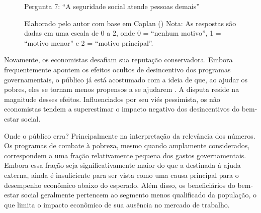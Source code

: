 \begin{figure}[H]
    \centering
    \caption*{Pergunta 7: “A seguridade social atende pessoas demais”}
    \caption{Elaborado pelo autor com base em Caplan (\citeyear{The_Myth_of_the_Rational_Voter}) \newline
    Nota: As respostas são dadas em uma escala de 0 a 2, onde 0 = “nenhum motivo”, 1 = “motivo menor” e 2 = “motivo principal”.}
    \label{fig:pergunta_7}
\end{figure}

Novamente, os economistas desafiam sua reputação conservadora. Embora frequentemente apontem os efeitos ocultos de desincentivo dos programas governamentais, o público já está acostumado com a ideia de que, ao ajudar os pobres, eles se tornam menos propensos a se ajudarem \cite{Murray1985-MURLGA-3}. A disputa reside na magnitude desses efeitos. Influenciados por seu viés pessimista, os não economistas tendem a superestimar o impacto negativo dos desincentivos do bem-estar social.

Onde o público erra? Principalmente na interpretação da relevância dos números. Os programas de combate à pobreza, mesmo quando amplamente considerados, correspondem a uma fração relativamente pequena dos gastos governamentais. Embora essa fração seja significativamente maior do que a destinada à ajuda externa, ainda é insuficiente para ser vista como uma causa principal para o desempenho econômico abaixo do esperado. Além disso, os beneficiários do bem-estar social geralmente pertencem ao segmento menos qualificado da população, o que limita o impacto econômico de sua ausência no mercado de trabalho.



